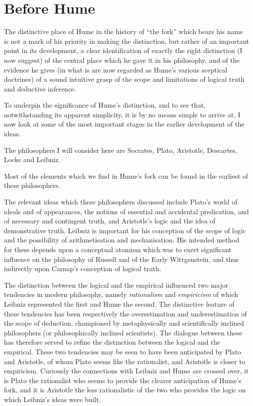 
\section{Before Hume}\label{Before}

The distinctive place of Hume in the history of ``the fork'' which
bears his name is not a mark of his priority in making the
distinction, but rather of an important point in its development, a
clear identification of exactly the right distinction (I now suggest)
of the central place which he gave it in his philosophy, and of the
evidence he gives (in what is are now regarded as Hume's various
sceptical doctrines) of a sound intuitive grasp of the scope and
limitations of logical truth and deductive inference.

To underpin the significance of Hume's distinction, and to see that,
notwithstanding its apparent simplicity, it is by no means simple to
arrive at, I now look at some of the most important stages in the
earlier development of the ideas.





The philosophers I will consider here are Socrates, Plato, Aristotle,
Descartes, Locke and Leibniz.

Most of the elements which we find in Hume's fork can be found in the
earliest of these philosophers.

The relevant ideas which these philosophers discussed include Plato's
world of ideals and of appearances, the notions of essential and
accidental predication, and of necessary and contingent truth, and
Aristotle's logic and the idea of demonstrative truth.
Leibniz is important for his conception of the scope of logic and the
possibility of arithmetisation and mechanisation.
His intended method for these depends upon a conceptual atomism which
was to exert significant influence on the philosophy of Russell and of
the Early Wittgenstein, and thus indirectly upon Carnap's conception
of logical truth.


The distinction between the logical and the empirical influenced two
major tendencies in modern philosophy, namely \emph{rationalism} and
\emph{empiricism} of which Leibniz represented the first and Hume the
second.
The distinctive feature of these tendencies has been respectively the
overestimation and underestimation of the scope of deduction,
championed by metaphysically and scientifically inclined philosophers
(or philosophically inclined scientists).
The dialogue between these has therefore served to refine the
distinction between the logical and the empirical.
These two tendencies may be seen to have been anticipated by Plato and
Aristotle, of whom Plato seems like the rationalist, and Aristotle is
closer to empiricism.
Curiously the connections with Leibniz and Hume are crossed over, it
is Plato the rationalist who seems to provide the clearer anticipation
of Hume's fork, and it is Aristotle the less rationalistic of the two
who provides the logic on which Leibniz's ideas were built.

